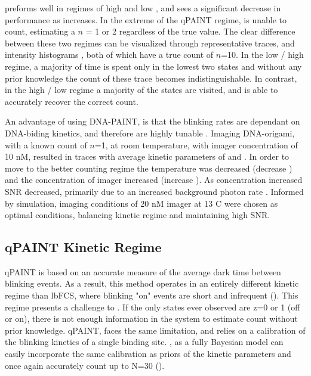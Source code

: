 \ours preforms well in regimes of high \pon and low \poff, and sees a significant decrease in performance as \poff increases. 
	In the extreme of the qPAINT regime, \ours is unable to count, estimating a $n$ = 1 or 2 regardless of the true value.
	The clear difference between these two regimes can be visualized through representative traces, and intensity histograms ,
	both of which have a true count of $n$=10.
	In the low \pon / high \poff regime, a majority of time is spent only in the lowest two states and without 
	any prior knowledge the count of these trace becomes indistinguishable.
	In contrast, in the high \pon / low \poff regime a majority of the states are visited, and \ours 
	is able to accurately recover the correct count.

An advantage of using DNA-PAINT, is that the blinking rates are dependant on DNA-biding kinetics,
	and therefore are highly tunable \cite{wade_2019, strauss_2020}. %
	Imaging DNA-origami, with a known count of $n$=1, at room temperature, with imager concentration of 10 nM, 
	resulted in traces with average kinetic parameters of  and  . 
	In order to move to the better counting regime the temperature was decreased (decrease \poff) 
	and the concentration of imager increased (increase \pon).
	As concentration increased SNR decreased, primarily due to an increased background photon rate \rb.
	Informed by simulation, imaging conditions of 20 nM imager at 13 C were chosen as optimal conditions,
	balancing kinetic regime and maintaining high SNR.



\subsection{qPAINT Kinetic Regime}
qPAINT is based on an accurate measure of the average dark time between blinking events. 
	As a result, this method operates in an entirely different kinetic regime than lbFCS, where blinking "on" events are short and infrequent ().
	This regime presents a challenge to \ours. 
	If the only states ever observed are z=0 or 1 (off or on), there is not enough information in the system to estimate count without prior knowledge.
	qPAINT, faces the same limitation, and relies on a calibration of the blinking kinetics of a single binding site.
	\ours, as a fully Bayesian model can easily incorporate the same calibration as priors of the kinetic parameters
	and once again accurately count up to N=30 ().

